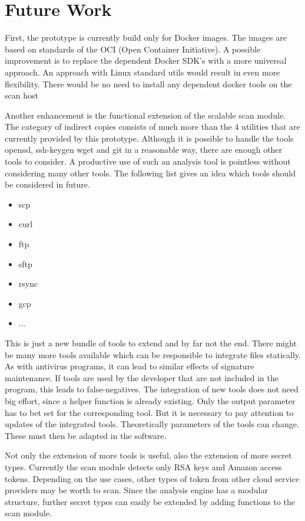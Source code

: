 \chapter{Future Work}
\label{ch:end:future}
First, the prototype is currently build only for Docker images. The images are based on standards of the OCI (Open Container Initiative). A possible improvement is to replace the dependent Docker SDK's with a more universal approach. An approach with Linux standard utils would result in even more flexibility. There would be no need to install any dependent docker tools on the scan host

Another enhancement is the functional extension of the scalable scan module. The category of indirect copies consists of much more than the 4 utilities that are currently provided by this prototype.
Although it is possible to handle the tools openssl, ssh-keygen wget and git in a reasonable way, there are enough other tools to consider. A productive use of such an analysis tool is pointless without considering many other tools.
The following list gives an idea which tools should be considered in future.
\begin{itemize}
\item scp
\item curl
\item ftp
\item sftp
\item rsync
\item gcp
\item ...
\end{itemize}
This is just a new bundle of tools to extend and by far not the end. There might be many more tools available which can be responsible to integrate files statically. As with antivirus programs, it can lead to similar effects of signature maintenance. If tools are used by the developer that are not included in the program, this leads to false-negatives. The integration of new tools does not need big effort, since a helper function is already existing. Only the output parameter has to bet set for the corresponding tool.
But it is necessary to pay attention to updates of the integrated tools. Theoretically parameters of the tools can change. These must then be adapted in the software.

Not only the extension of more tools is useful, also the extension of more secret types. Currently the scan module detects only RSA keys and Amazon access tokens. Depending on the use cases, other types of token from other cloud service providers may be worth to scan. Since the analysis engine has a modular structure, further secret types can easily be extended by adding functions to the scan module.


